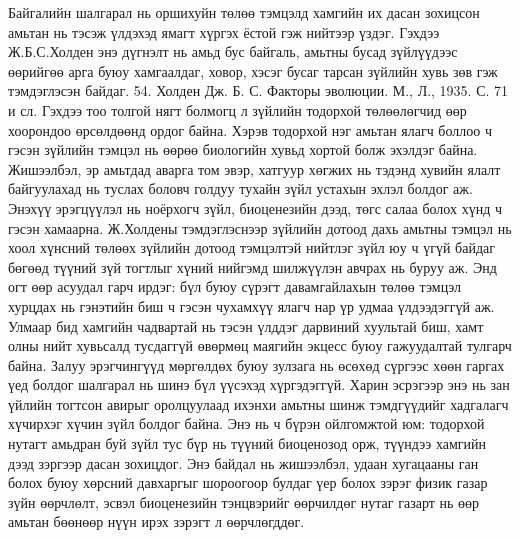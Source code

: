 Байгалийн шалгарал нь оршихуйн төлөө тэмцэлд хамгийн их дасан зохицсон амьтан нь тэсэж үлдэхэд ямагт хүргэх ёстой гэж нийтээр үздэг. Гэхдээ Ж.Б.С.Холден энэ дүгнэлт нь амьд бус байгаль, амьтны бусад зүйлүүдээс өөрийгөө арга буюу хамгаалдаг, ховор, хэсэг бусаг тарсан зүйлийн хувь зөв гэж тэмдэглэсэн байдаг. 54. Холден Дж. Б. С. Факторы эволюции. М., Л., 1935. С. 71 и сл.
Гэхдээ тоо толгой нягт болмогц л зүйлийн тодорхой төлөөлөгчид өөр хоорондоо өрсөлдөөнд ордог байна. Хэрэв тодорхой нэг амьтан ялагч боллоо ч гэсэн зүйлийн тэмцэл нь өөрөө биологийн хувьд хортой болж эхэлдэг байна. Жишээлбэл, эр амьтдад аварга том эвэр, хатгуур хөгжих нь тэдэнд хувийн ялалт байгуулахад нь туслах боловч голдуу тухайн зүйл устахын эхлэл болдог аж.
Энэхүү эрэгцүүлэл нь ноёрхогч зүйл, биоценезийн дээд, төгс салаа болох хүнд ч гэсэн хамаарна. Ж.Холдены тэмдэглэснээр зүйлийн дотоод дахь амьтны тэмцэл нь хоол хүнсний төлөөх зүйлийн дотоод тэмцэлтэй нийтлэг зүйл юу ч үгүй байдаг бөгөөд түүний зүй тогтлыг хүний нийгэмд шилжүүлэн авчрах нь буруу аж. Энд огт өөр асуудал гарч ирдэг: бүл буюу сүрэгт давамгайлахын төлөө тэмцэл хурцдах нь гэнэтийн биш ч гэсэн чухамхүү ялагч нар үр удмаа үлдээдэггүй аж. Улмаар бид хамгийн чадвартай нь тэсэн үлддэг дарвиний хуультай биш, хамт олны нийт хувьсалд тусдаггүй өвөрмөц маягийн экцесс буюу гажуудалтай тулгарч байна. Залуу эрэгчингүүд мөргөлдөх буюу зулзага нь өсөхөд сүргээс хөөн гаргах үед болдог шалгарал нь шинэ бүл үүсэхэд хүргэдэггүй. Харин эсрэгээр энэ нь зан үйлийн тогтсон авирыг оролцуулаад ихэнхи амьтны шинж тэмдгүүдийг хадгалагч хүчирхэг хүчин зүйл болдог байна. Энэ нь ч бүрэн ойлгомжтой юм: тодорхой нутагт амьдран буй зүйл тус бүр нь түүний биоценозод орж, түүндээ хамгийн дээд зэргээр дасан зохицдог. Энэ байдал нь жишээлбэл, удаан хугацааны ган болох буюу хөрсний давхаргыг шороогоор булдаг үер болох зэрэг физик газар зүйн өөрчлөлт, эсвэл биоценезийн тэнцвэрийг өөрчилдөг нутаг газарт нь өөр амьтан бөөнөөр нүүн ирэх зэрэгт л өөрчлөгддөг.
